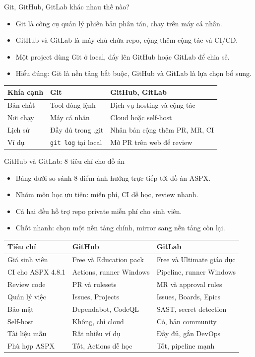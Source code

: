 \begin{frame}{Git, GitHub, GitLab khác nhau thế nào?}
\begin{itemize}
\item Git là công cụ quản lý phiên bản phân tán, chạy trên máy cá nhân.
\item GitHub và GitLab là máy chủ chứa repo, cộng thêm cộng tác và CI/CD.
\item Một project dùng Git ở local, đẩy lên GitHub hoặc GitLab để chia sẻ.
\item Hiểu đúng: Git là nền tảng bắt buộc, GitHub và GitLab là lựa chọn bổ sung.
\end{itemize}
{\small
\begin{tabular}{@{}p{2.0cm}p{3.4cm}p{4.2cm}@{}}
\toprule
Khía cạnh & Git & GitHub, GitLab \\
\midrule
Bản chất & Tool dòng lệnh & Dịch vụ hosting và cộng tác \\
Nơi chạy & Máy cá nhân & Cloud hoặc self-host \\
Lịch sử & Đầy đủ trong .git & Nhân bản cộng thêm PR, MR, CI \\
Ví dụ & \texttt{git log} tại local & Mở PR trên web để review \\
\bottomrule
\end{tabular}}
\end{frame}

\begin{frame}{GitHub và GitLab: 8 tiêu chí cho đồ án}
\begin{itemize}
\item Bảng dưới so sánh 8 điểm ảnh hưởng trực tiếp tới đồ án ASPX.
\item Nhóm môn học ưu tiên: miễn phí, CI dễ học, review nhanh.
\item Cả hai đều hỗ trợ repo private miễn phí cho sinh viên.
\item Chốt nhanh: chọn một nền tảng chính, mirror sang nền tảng còn lại.
\end{itemize}
{\footnotesize
\renewcommand{\arraystretch}{0.9}
\begin{tabular}{@{}p{2.6cm}p{3.3cm}p{3.7cm}@{}}
\toprule
Tiêu chí & GitHub & GitLab \\
\midrule
Giá sinh viên & Free và Education pack & Free và Ultimate giáo dục \\
CI cho ASPX 4.8.1 & Actions, runner Windows & Pipeline, runner Windows \\
Review code & PR và rulesets & MR và approval rules \\
Quản lý việc & Issues, Projects & Issues, Boards, Epics \\
Bảo mật & Dependabot, CodeQL & SAST, secret detection \\
Self-host & Không, chỉ cloud & Có, bản community \\
Tài liệu mẫu & Rất nhiều ví dụ & Đầy đủ, gắn DevOps \\
Phù hợp ASPX & Tốt, Actions dễ học & Tốt, pipeline mạnh \\
\bottomrule
\end{tabular}}
\end{frame}


